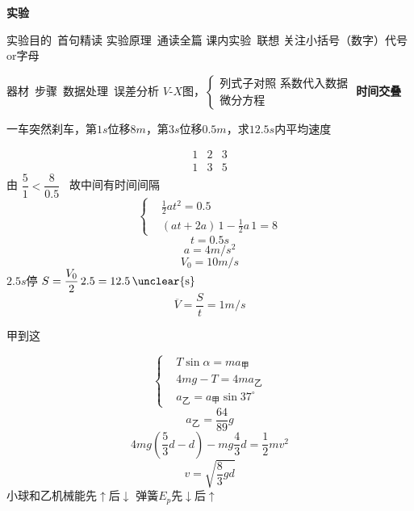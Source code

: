 \textbf{实验}\par
实验目的\ 首句精读 \quad 实验原理\ 通读全篇 \quad {}课内实验\ 联想 \quad 关注小括号（数字）代号or字母\par
器材\ 步骤\ 数据处理\ 误差分析
$V$-$X$图，\quad $\left\{\begin{array}{l}\text{列式子对照\ 系数代入数据}\\ \text{微分方程}\end{array}\right.$
\textbf{时间交叠}
\begin{problem}
一车突然刹车，第$1\unit{s}$位移$8\unit{m}$，第$3\unit{s}$位移$0.5\unit{m}$，求$12.5\unit{s}$内平均速度
\begin{solution}
\[ \begin{array}{ccc} 1&2&3\\ 1&3&5 \end{array} \]
由 $\dfrac{5}{1}<\dfrac{8}{0.5}$ \ 故中间有时间间隔
\[ \left\{\begin{aligned} &\frac{1}{2}at^2=0.5\\ &(at+2a)\,1-\frac{1}{2}a\,1=8 \end{aligned}\right. \]
\[ t=0.5\unit{s} \]
\[ a=4\unit{m/s^2} \]
\[ V_0=10\unit{m/s} \]
$2.5\unit{s}$停 \quad $S=\dfrac{V_0}{2}\,2.5=12.5\,\text{\unclear{s}}$ %
\[ \overline{V}=\frac{S}{t}=1\unit{m/s} \]
\end{solution}
\end{problem}
\begin{problem}
甲到这
\begin{solution}
\[ \left\{\begin{aligned} &T\sin\alpha=ma_{\text{甲}}\\ &4mg-T=4ma_{\text{乙}}\\ &a_{\text{乙}}=a_{\text{甲}}\sin37^\circ \end{aligned}\right. \] %
\[ a_{\text{乙}}=\frac{64}{89}g \]
\[ 4mg\left(\frac{5}{3}d-d\right)-mg\frac{4}{3}d=\frac{1}{2}mv^2 \]
\[ v=\sqrt{\frac{8}{3}gd} \]
小球和乙机械能先$\uparrow$后$\downarrow$ \qquad {}弹簧$E_p$先$\downarrow$后$\uparrow$
\end{solution}
\end{problem}
